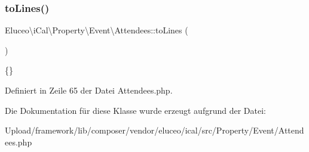\mbox{\label{class_eluceo_1_1i_cal_1_1_property_1_1_event_1_1_attendees_a7edb50bd87ab091d6ed6d296634e85e5}} 
\subsubsection{\texorpdfstring{to\+Lines()}{toLines()}\hspace{0.1cm}{\footnotesize\ttfamily [3/3]}}
{\footnotesize\ttfamily Eluceo\textbackslash{}i\+Cal\textbackslash{}\+Property\textbackslash{}\+Event\textbackslash{}\+Attendees\+::to\+Lines (\begin{DoxyParamCaption}{ }\end{DoxyParamCaption})}

\{\} 

Definiert in Zeile 65 der Datei Attendees.\+php.



Die Dokumentation für diese Klasse wurde erzeugt aufgrund der Datei\+:\begin{DoxyCompactItemize}
\item 
Upload/framework/lib/composer/vendor/eluceo/ical/src/\+Property/\+Event/Attendees.\+php\end{DoxyCompactItemize}

